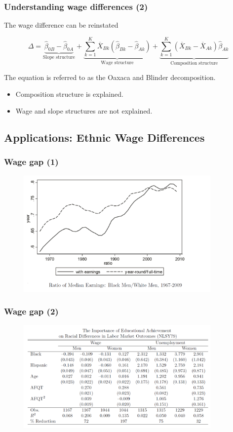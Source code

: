 \documentclass{beamer}
\newcommand{\1}{\mathbb{1}}
\begin{document}
\begin{frame}\frametitle{Understanding wage differences (2)}

The wage difference can be reinstated 

\begin{equation*}
\Delta = \underbrace{\widehat{\beta}_{0B}-\widehat{\beta}_{0A}}_{\text{Slope structure}} + \underbrace{\sum_{k=1}^{K} \overline{X}_{Bk}(\widehat{\beta}_{Bk}-\widehat{\beta}_{Ak})}_{\text{Wage structure}} + \underbrace{\sum_{k=1}^{K} (\overline{X}_{Bk}-\overline{X}_{Ak})\widehat{\beta}_{Ak}}_{\text{Composition structure}}
\end{equation*}

The equation is referred to as the Oaxaca and Blinder decomposition.
\begin{itemize}
\item Composition structure is explained.
\item Wage and slope structures are not explained. 
\end{itemize}
 \end{frame}


\subsection{Applications: Ethnic Wage Differences}


\begin{frame}\frametitle{Wage gap (1)}
\begin{figure}
\includegraphics[width = 10cm]{plot/racegap}
\end{figure}
\end{frame}

\begin{frame}\frametitle{Wage gap (2)}
\begin{figure}
\includegraphics[width = 10cm]{plot/explanation}
\end{figure}
\end{frame}
\end{document}
